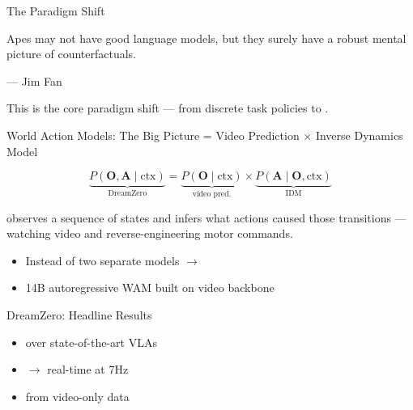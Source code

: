 \begin{frame}{The Paradigm Shift}
\begin{quotebox}
Apes may not have good language models, but they surely
have a robust mental picture of counterfactuals.
\end{quotebox}
\hfill --- Jim Fan \citep{fan2026secondparadigm}

\vspace{0.5em}
\begin{softbox}
 This is the core paradigm shift ---
from discrete task policies to
.
\end{softbox}
\end{frame}

\begin{frame}{World Action Models: The Big Picture}
 = Video Prediction $\times$ Inverse Dynamics Model

\vspace{0.5em}
\begin{eqbox}
\begin{equation*}
\underbrace{P(\mathbf{O}, \mathbf{A} \mid \text{ctx})}_{\text{DreamZero}}
  = \underbrace{P(\mathbf{O} \mid \text{ctx})}_{\text{video pred.}}
  \times \underbrace{P(\mathbf{A} \mid \mathbf{O},
  \text{ctx})}_{\text{IDM}}
\end{equation*}
\end{eqbox}

\vspace{0.3em}
{\small{} observes a sequence of states
and infers what actions caused those transitions ---
watching video and reverse-engineering motor commands.}

\vspace{0.5em}
\begin{itemize}
    \item Instead of two separate models
          $\rightarrow$ 
    \item {} 14B autoregressive WAM built on
           video backbone \citep{wan2025wan}
\end{itemize}
\end{frame}

\begin{frame}{DreamZero: Headline Results}
\begin{resultbox}
\begin{itemize}
    \item {}
          over state-of-the-art VLAs
    \item {}
          $\rightarrow$ real-time at 7Hz
    \item {}
          from video-only data
\end{itemize}
\end{resultbox}
\end{frame}


